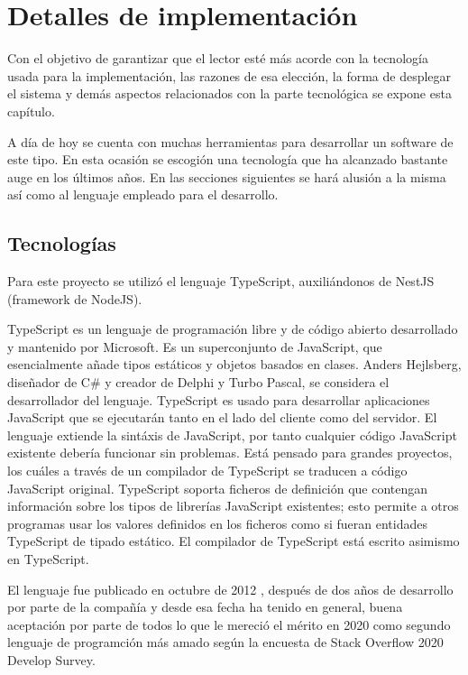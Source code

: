\chapter{Detalles de implementación}\label{cap:implementation_details}

Con el objetivo de garantizar que el lector esté más acorde con la tecnología usada para la implementación, las razones de esa elección, la forma de desplegar el sistema y demás aspectos relacionados con la parte tecnológica se expone esta capítulo.

A día de hoy se cuenta con muchas herramientas para desarrollar un software de este tipo. En esta ocasión se escogión una tecnología que ha alcanzado bastante auge en los últimos años. En las secciones siguientes se hará alusión a la misma así como al lenguaje empleado para el desarrollo.

\section{Tecnologías}
Para este proyecto se utilizó el lenguaje TypeScript, auxiliándonos de NestJS (framework de NodeJS).

\label{lenguage}
\cite{wiki_ts}
TypeScript es un lenguaje de programación libre y de código abierto desarrollado y mantenido por Microsoft. Es un superconjunto de JavaScript, que esencialmente añade tipos estáticos y objetos basados en clases. Anders Hejlsberg, diseñador de C\# y creador de Delphi y Turbo Pascal, se considera el desarrollador del lenguaje. TypeScript es usado para desarrollar aplicaciones JavaScript que se ejecutarán tanto en el lado del cliente como del servidor. El lenguaje extiende la sintáxis de JavaScript, por tanto cualquier código JavaScript existente debería  funcionar sin problemas. Está pensado para grandes proyectos, los cuáles a través de un compilador de TypeScript se traducen a código JavaScript original. TypeScript soporta ficheros de definición que contengan información sobre los tipos de librerías JavaScript existentes; esto permite a otros programas usar los valores definidos en los ficheros como si fueran entidades TypeScript de tipado estático. El compilador de TypeScript está escrito asimismo en TypeScript. 

El lenguaje fue publicado en octubre de 2012 , después de dos años de desarrollo por parte de la compañía y desde esa fecha ha tenido en general, buena aceptación por parte de todos lo que le mereció el mérito en 2020 como segundo lenguaje de programción más amado según la encuesta de Stack Overflow\cite{stack_overflow} 2020 Develop Survey.

